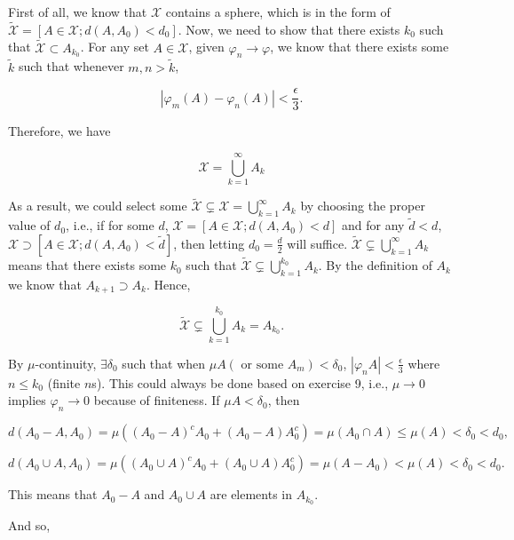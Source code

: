 \documentclass[
]{article}
\begin{document}
First of all, we know that \(\mathcal X\) contains a sphere, which is in
the form of
\(\widetilde{\mathcal X} = \left[A \in \mathcal X ; d\left(A, A_0\right) < d_0\right]\).
Now, we need to show that there exists \(k_0\) such that
\(\widetilde{\mathcal X} \subset A_{k_0}\). For any set
\(A \in \mathcal X\), given \(\varphi_n \to \varphi\), we know that
there exists some \(\tilde k\) such that whenever \(m, n > \tilde k\),

\[\left|\varphi_m\left(A\right) - \varphi_n\left(A\right)\right| < \frac{\epsilon}{3}.\]

Therefore, we have

\[\mathcal X = \bigcup_{k=1}^\infty A_k\]

As a result, we could select some
\(\widetilde{\mathcal X} \subsetneq \mathcal X =  \bigcup_{k=1}^\infty A_k\)
by choosing the proper value of \(d_0\), i.e., if for some \(d\),
\(\mathcal X = \left[A \in \mathcal X ; d\left(A, A_0\right) < d\right]\)
and for any \(\tilde d  < d\),
\(\mathcal X \supset \left[A \in \mathcal X ; d\left(A, A_0\right) < \tilde d\right]\),
then letting \(d_0 = \frac{d}{2}\) will suffice.
\(\widetilde{\mathcal X} \subsetneq \bigcup_{k=1}^\infty A_k\) means
that there exists some \(k_0\) such that
\(\widetilde{\mathcal X} \subsetneq \bigcup_{k=1}^{k_0} A_k\). By the
definition of \(A_k\) we know that \(A_{k+1} \supset A_k\). Hence,

\[\widetilde{\mathcal X} \subsetneq \bigcup_{k=1}^{k_0} A_k = A_{k_0}.\]

By \(\mu\)-continuity, \(\exists \delta_0\) such that when
\(\mu A(\text{ or some }A_m) < \delta_0\),
\(|\varphi_n A| < \frac{\epsilon}{3}\) where \(n \le k_0\) (finite
\(n\)\textquotesingle s). This could always be done based on exercise 9,
i.e., \(\mu \to 0\) implies \(\varphi_n \to 0\) because of finiteness.
If \(\mu A<\delta_0\), then

\[d\left(A_0-A, A_0\right) = \mu\left((A_0 - A)^c A_0 + (A_0 - A)A_0^c\right) = \mu(A_0\cap A) \le \mu(A) < \delta_0 < d_0,\]

\[d\left(A_0 \cup A, A_0\right) = \mu((A_0\cup A)^c A_0 + (A_0\cup A)A_0^c) = \mu(A - A_0) < \mu(A) < \delta_0 < d_0.\]

This means that \(A_0 - A\) and \(A_0 \cup A\) are elements in
\(A_{k_0}\).

And so,
\end{document}
